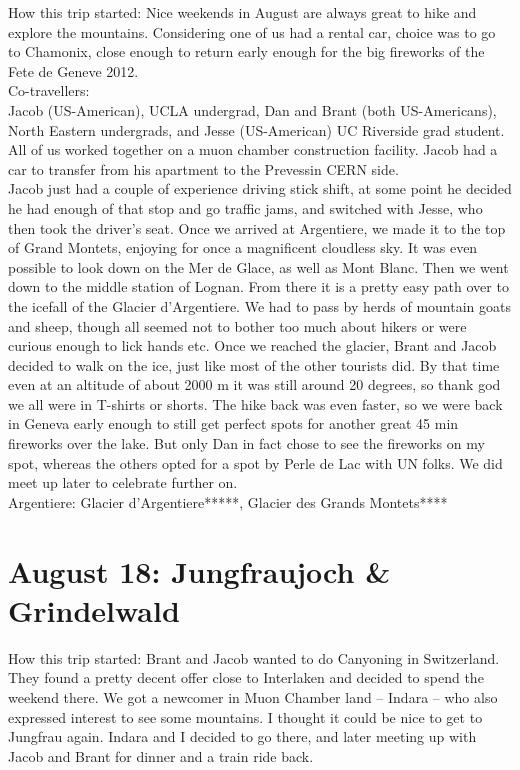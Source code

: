 How this trip started: Nice weekends in August are always great to hike and explore the mountains. Considering one of us had a rental car, choice was to go to Chamonix, close enough to return early enough for the big fireworks of the Fete de Geneve 2012.\\

Co-travellers:\\
Jacob (US-American), UCLA undergrad, Dan and Brant (both US-Americans), North Eastern undergrads, and Jesse (US-American) UC Riverside grad student. All of us worked together on a muon chamber construction facility. Jacob had a car to transfer from his apartment to the Prevessin CERN side.\\

Jacob just had a couple of experience driving stick shift, at some point he decided he had enough of that stop and go traffic jams, and switched with Jesse, who then took the driver's seat. Once we arrived at Argentiere, we made it to the top of Grand Montets, enjoying for once a magnificent cloudless sky. It was even possible to look down on the Mer de Glace, as well as Mont Blanc. Then we went down to the middle station of Lognan. From there it is a pretty easy path over to the icefall of the Glacier d'Argentiere. We had to pass by herds of mountain goats and sheep, though all seemed not to bother too much about hikers or were curious enough to lick hands etc. Once we reached the glacier, Brant and Jacob decided to walk on the ice, just like most of the other tourists did. By that time even at an altitude of about 2000 m it was still around 20 degrees, so thank god we all were in T-shirts or shorts. The hike back was even faster, so we were back in Geneva early enough to still get perfect spots for another great 45 min fireworks over the lake. But only Dan in fact chose to see the fireworks on my spot, whereas the others opted for a spot by Perle de Lac with UN folks. We did meet up later to celebrate further on.\\

Argentiere: Glacier d'Argentiere*****, Glacier des Grands Montets****

\section{August 18: Jungfraujoch \& Grindelwald}
\label{Jsungfrau2012}

How this trip started: Brant and Jacob wanted to do Canyoning in Switzerland. They found a pretty decent offer close to Interlaken and decided to spend the weekend there. We got a newcomer in Muon Chamber land -- Indara -- who also expressed interest to see some mountains. I thought it could be nice to get to Jungfrau again. Indara and I decided to go there, and later meeting up with Jacob and Brant for dinner and a train ride back.\\

